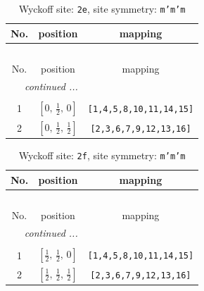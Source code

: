 \documentclass[fleqn,8pt]{jsarticle}
\begin{document}
\begin{longtable}{ccc}
\caption{Wyckoff site: {\tt 2e}, site symmetry: {\tt m'm'm}}
 \\
 \hline \hline
No. & position & mapping \\ \hline \endfirsthead

\multicolumn{2}{l}{\tablename\ \thetable{}} \\
 \hline \hline
No. & position & mapping \\ \hline \endhead

 \hline \hline
\multicolumn{2}{r}{\footnotesize\it continued ...} \\ \endfoot

 \hline \hline
\multicolumn{2}{r}{} \\ \endlastfoot

1 & $\left[ 0,\, \frac{1}{2},\, 0 \right]$ & {\tt [1,4,5,8,10,11,14,15]} \\ \hline
2 & $\left[ 0,\, \frac{1}{2},\, \frac{1}{2} \right]$ & {\tt [2,3,6,7,9,12,13,16]} \\
\end{longtable}
\renewcommand{\arraystretch}{1.2}
\begin{longtable}{ccc}
\caption{Wyckoff site: {\tt 2f}, site symmetry: {\tt m'm'm}}
 \\
 \hline \hline
No. & position & mapping \\ \hline \endfirsthead

\multicolumn{2}{l}{\tablename\ \thetable{}} \\
 \hline \hline
No. & position & mapping \\ \hline \endhead

 \hline \hline
\multicolumn{2}{r}{\footnotesize\it continued ...} \\ \endfoot

 \hline \hline
\multicolumn{2}{r}{} \\ \endlastfoot

1 & $\left[ \frac{1}{2},\, \frac{1}{2},\, 0 \right]$ & {\tt [1,4,5,8,10,11,14,15]} \\ \hline
2 & $\left[ \frac{1}{2},\, \frac{1}{2},\, \frac{1}{2} \right]$ & {\tt [2,3,6,7,9,12,13,16]} \\
\end{longtable}
\renewcommand{\arraystretch}{1.2}
\end{document}
